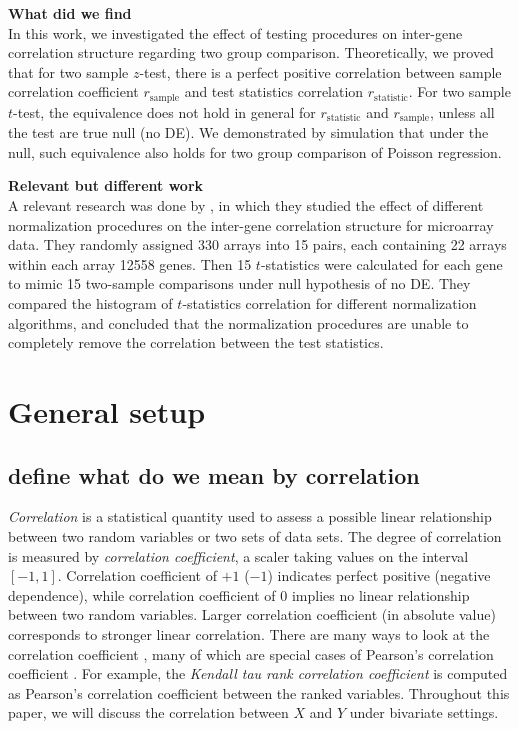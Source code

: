 \documentclass[12pt, a4paper]{article}
\begin{document}
	
		\textbf{What did we find}\\
		In this work, we investigated the effect of testing procedures on inter-gene correlation structure
		regarding two group comparison. Theoretically, we proved that for two sample $z$-test, there is a
		perfect positive correlation between sample correlation coefficient $r_{\text{sample}}$ and test
		statistics correlation $r_{\text{statistic}}$. For two sample $t$-test, the equivalence does not
		hold in general for $r_{\text{statistic}}$ and $r_{\text{sample}}$, unless all the test are true
		null (no DE).  We demonstrated by simulation that under the null, such equivalence also holds for
		two group comparison of Poisson regression. 
		
		
	
	\textbf{Relevant but different work}\\
	A relevant research was done by \citet{qiu2005effects}, in which they studied the effect of different
	normalization procedures on the inter-gene correlation structure for microarray data. They randomly
	assigned 330 arrays into 15 pairs, each containing 22 arrays within each array 12558 genes. Then 15
	$t$-statistics were calculated for each gene to mimic 15 two-sample comparisons under null
	hypothesis of no DE. They compared the histogram of $t$-statistics correlation for different
	normalization algorithms, and concluded that the normalization procedures are unable to completely
	remove the correlation between the test statistics. %
	

	
	
	
	
	
	\section{General setup}
	
	\subsection{define what do we mean by correlation}
	\textit{Correlation} is a statistical quantity used to assess a possible linear relationship between two random variables or two sets of 
	data sets. The degree of correlation is measured by \textit{correlation coefficient}, a scaler taking values on the interval $[-1, 1]$. 
	Correlation coefficient of $+1$ ($-1$) indicates perfect positive (negative dependence), while correlation coefficient of 0 implies no linear 
	relationship between two random variables. Larger correlation coefficient (in absolute value) corresponds to stronger linear correlation. 
	There are many ways to look at the correlation coefficient , many of which are special cases of Pearson's correlation coefficient 
	\citep{lee1988thirteen}. For example, the \textit{Kendall tau rank correlation coefficient} is computed as Pearson's correlation coefficient between the ranked variables. Throughout this paper, we will discuss the correlation between $X$ and $Y$ under bivariate settings. 
	 
\end{document}
